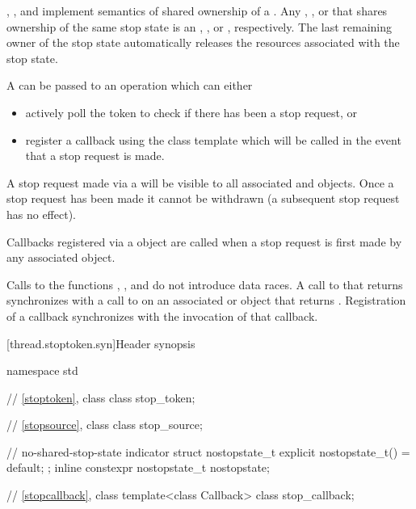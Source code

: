 \pnum
{}, , and 
implement semantics of shared ownership of a .
Any , , or 
that shares ownership of the same stop state is an 
, , or , respectively.
The last remaining owner of the stop state automatically
releases the resources associated with the stop state.

\pnum
A  can be passed to an operation which can either
\begin{itemize}
 \item actively poll the token to check if there has been a stop request, or
 \item register a callback using the  class template which
        will be called in the event that a stop request is made.
\end{itemize}
A stop request made via a  will be visible to all
associated  and  objects.
Once a stop request has been made it cannot be withdrawn
(a subsequent stop request has no effect).

\pnum
Callbacks registered via a  object are called when
a stop request is first made by any associated  object.

\pnum
Calls to the functions , ,
and 
do not introduce data races.
A call to  that returns 
synchronizes with a call to 
on an associated  or  object
that returns .
Registration of a callback synchronizes with the invocation of that callback.


[thread.stoptoken.syn]{Header  synopsis}
%

\begin{codeblock}
namespace std {
  // \ref{stoptoken}, class 
  class stop_token;

  // \ref{stopsource}, class 
  class stop_source;

  // no-shared-stop-state indicator
  struct nostopstate_t {
    explicit nostopstate_t() = default;
  };
  inline constexpr nostopstate_t nostopstate{};

  // \ref{stopcallback}, class 
  template<class Callback>
  class stop_callback;
}
\end{codeblock}


